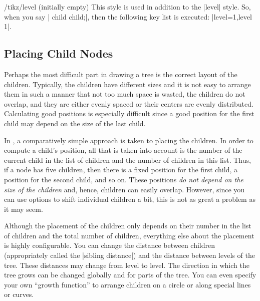 \begin{stylekey}{/tikz/level  (initially \normalfont empty)}
  This style is used in addition to the |level| style. So, when you
  say | child child;|, then the following key list is
  executed: |level=1,level 1|. 

\begin{codeexample}[]
\end{codeexample}
\end{stylekey}



\subsection{Placing Child Nodes}

\label{section-tree-placement}

Perhaps the most difficult part in drawing a tree is the correct
layout of the children. Typically, the children have different sizes
and it is not easy to arrange them in such a manner that not too much
space is wasted, the children do not overlap, and they are either 
evenly spaced or their centers are evenly distributed. Calculating
good positions is especially difficult since a good position for the
first child may depend on the size of the last child.

In \tikzname, a comparatively simple approach is taken to placing the
children. In order to compute a child's position, all that is taken
into account is the number of the current child in the list of
children and the number of children in this list. Thus, if a node has
five children, then there is a fixed position for the first child, a
position for the second child, and so on. These positions \emph{do not
  depend on the size of the children} and, hence, children can easily
overlap. However, since you can use options to shift individual
children a bit, this is not as great a problem as it may seem.

Although the placement of the children only depends on their number in
the list of children and the total number of children, everything else
about the placement is highly configurable. You can change the
distance between children (appropriately called the
|sibling distance|) and the distance between levels of the tree. These
distances may change from level to level. The direction in which the
tree grows can be changed globally and for parts of the tree. You can
even specify your own ``growth function'' to arrange children on a
circle or along special lines or curves. 

